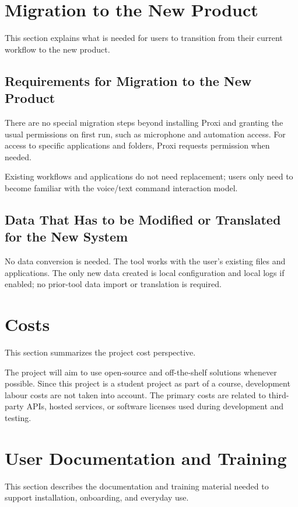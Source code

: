 \documentclass[12pt]{article}
\begin{document}
\section{Migration to the New Product}
This section explains what is needed for users to transition from
their current workflow to the new product.

\subsection{Requirements for Migration to the New Product}
There are no special migration steps beyond installing Proxi and
granting the usual permissions on first run, such as microphone and
automation access. For access to specific applications and folders,
Proxi requests permission when needed.

Existing workflows and applications do not need replacement; users only
need to become familiar with the voice/text command interaction model.

\subsection{Data That Has to be Modified or Translated for the New
System}
No data conversion is needed. The tool works with the user's existing
files and applications. The only new data created is local
configuration and local logs if enabled; no prior-tool data import or
translation is required.

\section{Costs}
This section summarizes the project cost perspective.

The project will aim to use open-source and off-the-shelf solutions
whenever possible. Since this project is a student project as part of
a course, development labour costs are not taken into account. The
primary costs are related to third-party APIs, hosted services, or
software licenses used during development and testing.

\section{User Documentation and Training}
This section describes the documentation and training material needed
to support installation, onboarding, and everyday use.
\end{document}
